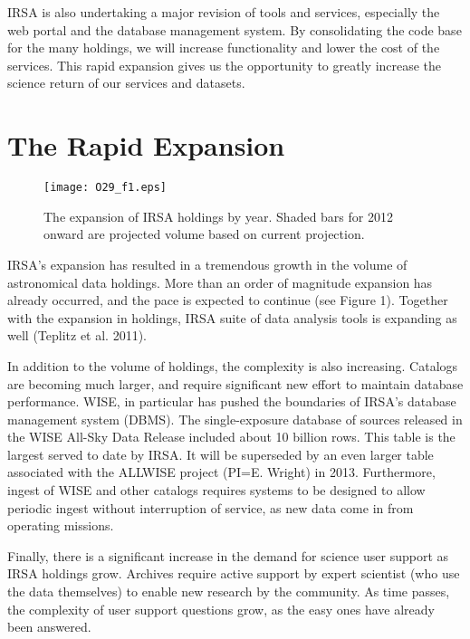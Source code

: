 \documentclass[11pt,twoside]{article}
\begin{document}
IRSA is also undertaking a
major revision of tools and services, especially the web portal and
the database management system. By consolidating the code base for the
many holdings, we will increase functionality and lower the cost of
the services. This rapid expansion gives us the opportunity to greatly
increase the science return of our services and datasets.




\section{The Rapid Expansion}

\begin{figure}[t]

\centering
\texttt{[image: O29\_f1.eps]}
\caption{The expansion of IRSA holdings by year.  Shaded  bars for
  2012 onward are projected volume based on current projection.}

\end{figure}


IRSA's expansion has resulted in a tremendous growth in the volume of
astronomical data holdings.  More than an order of magnitude expansion
has already occurred, and the pace is expected to continue (see Figure
1).  Together with the expansion in holdings, IRSA suite of data analysis
tools is expanding as well (Teplitz et al. 2011).

In addition to the volume of holdings, the complexity is also
increasing.  Catalogs are becoming much larger, and require
significant new effort to maintain database performance.  WISE, in
particular has pushed the boundaries of IRSA's database management
system (DBMS).  The single-exposure database of sources released in
the WISE All-Sky Data Release included about 10 billion
rows.  This table is the largest served to date by IRSA. It will be
superseded by an even larger table associated with the ALLWISE project
(PI=E. Wright) in 2013.  Furthermore, ingest of WISE and other catalogs requires systems to be
designed to allow periodic ingest without interruption of service, as
new data come in from operating missions.  

Finally, there is a significant increase in the demand for
science user support as IRSA holdings grow.  Archives require active
support by expert scientist (who use the data themselves) to enable
new research by the community.  As time passes, the complexity of user
support questions grow, as the easy ones have already been answered.
\end{document}
